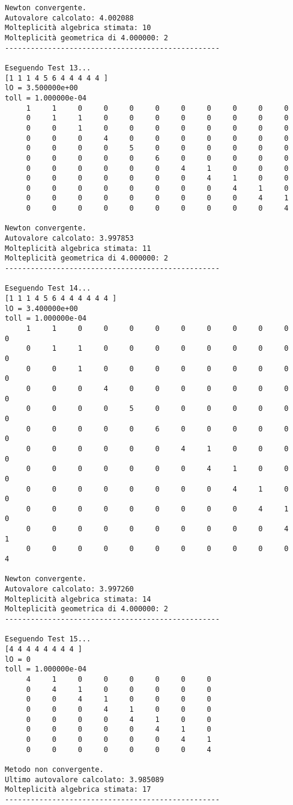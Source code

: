 \documentclass[12pt]{article}
\begin{document}
\begin{verbatim}
Newton convergente.
Autovalore calcolato: 4.002088
Molteplicità algebrica stimata: 10
Molteplicità geometrica di 4.000000: 2
--------------------------------------------------

Eseguendo Test 13...
[1 1 1 4 5 6 4 4 4 4 4 ]
lO = 3.500000e+00
toll = 1.000000e-04
     1     1     0     0     0     0     0     0     0     0     0
     0     1     1     0     0     0     0     0     0     0     0
     0     0     1     0     0     0     0     0     0     0     0
     0     0     0     4     0     0     0     0     0     0     0
     0     0     0     0     5     0     0     0     0     0     0
     0     0     0     0     0     6     0     0     0     0     0
     0     0     0     0     0     0     4     1     0     0     0
     0     0     0     0     0     0     0     4     1     0     0
     0     0     0     0     0     0     0     0     4     1     0
     0     0     0     0     0     0     0     0     0     4     1
     0     0     0     0     0     0     0     0     0     0     4

Newton convergente.
Autovalore calcolato: 3.997853
Molteplicità algebrica stimata: 11
Molteplicità geometrica di 4.000000: 2
--------------------------------------------------

Eseguendo Test 14...
[1 1 1 4 5 6 4 4 4 4 4 4 ]
lO = 3.400000e+00
toll = 1.000000e-04
     1     1     0     0     0     0     0     0     0     0     0     0
     0     1     1     0     0     0     0     0     0     0     0     0
     0     0     1     0     0     0     0     0     0     0     0     0
     0     0     0     4     0     0     0     0     0     0     0     0
     0     0     0     0     5     0     0     0     0     0     0     0
     0     0     0     0     0     6     0     0     0     0     0     0
     0     0     0     0     0     0     4     1     0     0     0     0
     0     0     0     0     0     0     0     4     1     0     0     0
     0     0     0     0     0     0     0     0     4     1     0     0
     0     0     0     0     0     0     0     0     0     4     1     0
     0     0     0     0     0     0     0     0     0     0     4     1
     0     0     0     0     0     0     0     0     0     0     0     4

Newton convergente.
Autovalore calcolato: 3.997260
Molteplicità algebrica stimata: 14
Molteplicità geometrica di 4.000000: 2
--------------------------------------------------

Eseguendo Test 15...
[4 4 4 4 4 4 4 4 ]
lO = 0
toll = 1.000000e-04
     4     1     0     0     0     0     0     0
     0     4     1     0     0     0     0     0
     0     0     4     1     0     0     0     0
     0     0     0     4     1     0     0     0
     0     0     0     0     4     1     0     0
     0     0     0     0     0     4     1     0
     0     0     0     0     0     0     4     1
     0     0     0     0     0     0     0     4

Metodo non convergente.
Ultimo autovalore calcolato: 3.985089
Molteplicità algebrica stimata: 17
--------------------------------------------------
    \end{verbatim}
    \newpage
\end{document}
